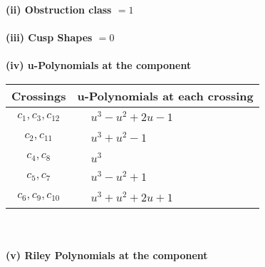 \documentclass[1p]{elsarticle_modified}
\theoremstyle{definition}
\begin{document}
\flushleft \textbf{(ii) Obstruction class $= 1$}\\~\\
\flushleft \textbf{(iii) Cusp Shapes $= 0$}\\~\\
\newpage\renewcommand{\arraystretch}{1}
\flushleft \textbf{(iv) u-Polynomials at the component}\newline \\
\begin{tabular}{m{50pt}|m{274pt}}
Crossings & \hspace{64pt}u-Polynomials at each crossing \\
\hline $$\begin{aligned}c_{1},c_{3},c_{12}\end{aligned}$$&$\begin{aligned}
&u^3- u^2+2 u-1
\end{aligned}$\\
\hline $$\begin{aligned}c_{2},c_{11}\end{aligned}$$&$\begin{aligned}
&u^3+u^2-1
\end{aligned}$\\
\hline $$\begin{aligned}c_{4},c_{8}\end{aligned}$$&$\begin{aligned}
&u^3
\end{aligned}$\\
\hline $$\begin{aligned}c_{5},c_{7}\end{aligned}$$&$\begin{aligned}
&u^3- u^2+1
\end{aligned}$\\
\hline $$\begin{aligned}c_{6},c_{9},c_{10}\end{aligned}$$&$\begin{aligned}
&u^3+u^2+2 u+1
\end{aligned}$\\
\hline
\end{tabular}\\~\\
\newpage\renewcommand{\arraystretch}{1}
\flushleft \textbf{(v) Riley Polynomials at the component}\newline \\
\end{document}
